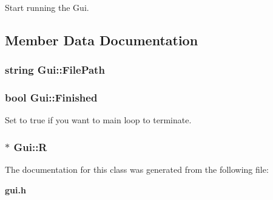 Start running the Gui.



\subsection{Member Data Documentation}
\subsubsection{\setlength{\rightskip}{0pt plus 5cm}string Gui::File\-Path\hspace{0.3cm}{\tt  [protected]}}\label{class_Gui_n0}


\subsubsection{\setlength{\rightskip}{0pt plus 5cm}bool Gui::Finished}\label{class_Gui_m1}


Set to true if you want to main loop to terminate.

\subsubsection{$\ast$ Gui::R}\label{class_Gui_m0}




The documentation for this class was generated from the following file:\begin{CompactItemize}
\item 
{\bf gui.h}\end{CompactItemize}
